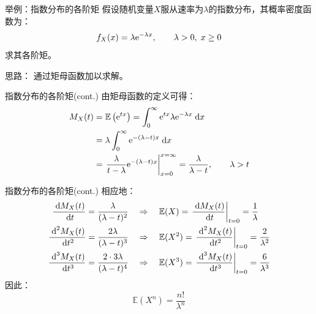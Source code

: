 \documentclass[t]{beamer}
\newcommand{\dif}{{\;\rm d}}
\newcommand{\E}{\mathbb{E}}
\begin{document}
  \begin{frame}{举例：指数分布的各阶矩}
    假设随机变量$X$服从速率为$\lambda$的指数分布，其概率密度函数为：
    \begin{equation*}f_X(x)=\lambda {\rm e}^{-\lambda x},\qquad
    \lambda>0, \; x\ge0 \end{equation*}
      求其各阶矩。
  
      \begin{block}{思路：}
        通过矩母函数加以求解。
      \end{block}
  \end{frame}


  \begin{frame}{指数分布的各阶矩(cont.)}
    由矩母函数的定义可得：
    \begin{equation*}\begin{split}
    M_X(t)&=\E\left({\rm e}^{tx}\right)=\int^{\infty}_0 {\rm
    e}^{tx}\lambda {\rm e}^{-\lambda x}\dif x\\
    &=\lambda \int^{\infty}_0 {\rm e}^{-(\lambda-t)x}\dif x\\
    &=\left.\frac{\lambda}{t-\lambda}{\rm
    e}^{-(\lambda-t)x}\right|^{x=\infty}_{x=0}=\frac{\lambda}{\lambda-t},\qquad
    \lambda>t
    \end{split} \end{equation*}
  \end{frame}


  \begin{frame}{指数分布的各阶矩(cont.)}
    相应地：
    \begin{equation*}\begin{split}
    \frac{\dif M_X(t)}{\dif
    t}=\frac{\lambda}{(\lambda-t)^2}&\quad\Rightarrow\quad \E
    (X)=\left.\frac{\dif M_X(t)}{\dif
    t}\right|_{t=0}=\frac{1}{\lambda}\\
    \frac{\dif^2 M_X(t)}{\dif
    t^2}=\frac{2\lambda}{(\lambda-t)^3}&\quad\Rightarrow\quad \E
    (X^2)=\left.\frac{\dif^2 M_X(t)}{\dif
    t^2}\right|_{t=0}=\frac{2}{\lambda^2}\\
    \frac{\dif^3 M_X(t)}{\dif t^3}=\frac{2\cdot
    3\lambda}{(\lambda-t)^4}&\quad\Rightarrow\quad \E
    (X^3)=\left.\frac{\dif^3 M_X(t)}{\dif
    t^3}\right|_{t=0}=\frac{6}{\lambda^3}\\
    \end{split}\end{equation*}
    因此：$$\E (X^n)=\frac{n!}{\lambda^n}$$
  
  \end{frame}
  
\end{document}
